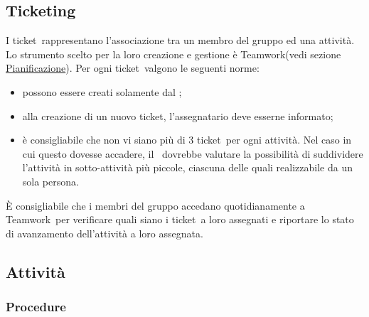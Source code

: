 \documentclass[../NormeProgetto.tex]{subfiles}
\begin{document}
	\subsection{Ticketing}
			I ticket\g\ rappresentano l'associazione tra un membro del gruppo ed una attività. Lo strumento scelto per la loro creazione e gestione è Teamwork\g (vedi sezione \hyperref[sec: Pianificazione Teamwork]{Pianificazione}). Per ogni ticket\g\ valgono le seguenti norme:
			\begin{itemize}
				\item possono essere creati solamente dal \responsabilediprogetto;
				\item alla creazione di un nuovo ticket\g, l'assegnatario deve esserne informato;
				\item è consigliabile che non vi siano più di 3 ticket\g\ per ogni attività. Nel caso in cui questo dovesse accadere, il \responsabilediprogetto\ dovrebbe valutare la possibilità di suddividere l'attività in sotto-attività più piccole, ciascuna delle quali realizzabile da un sola persona.
			\end{itemize}			 
			 È consigliabile che i membri del gruppo accedano quotidianamente a Teamwork\g\ per verificare quali siano i ticket\g\ a loro assegnati e riportare lo stato di avanzamento dell'attività a loro assegnata.
	\subsection{Attività}
		\subsubsection{Procedure}
\end{document}
